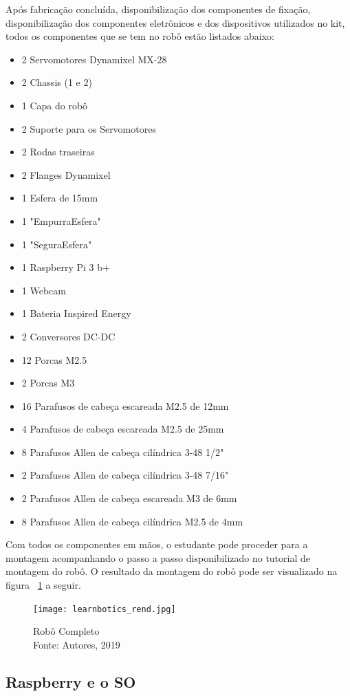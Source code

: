 Após fabricação concluída, disponibilização dos componentes de fixação, disponibilização dos componentes eletrônicos e dos dispositivos utilizados no kit, todos os componentes que se tem no robô estão listados abaixo:
\begin{itemize}
	\item 2 Servomotores Dynamixel MX-28
	\item 2 Chassis (1 e 2)
	\item 1 Capa do robô
	\item 2 Suporte para os Servomotores
	\item 2 Rodas traseiras
	\item 2 Flanges Dynamixel
	\item 1 Esfera de 15mm
	\item 1 "EmpurraEsfera"
	\item 1 "SeguraEsfera"
	\item 1 Raspberry Pi 3 b+
	\item 1 Webcam
	\item 1 Bateria Inspired Energy
	\item 2 Conversores DC-DC
	\item 12 Porcas M2.5
	\item 2 Porcas M3
	\item 16 Parafusos de cabeça escareada M2.5 de 12mm
	\item 4 Parafusos de cabeça escareada M2.5 de 25mm
	\item 8 Parafusos Allen de cabeça cilíndrica 3-48 1/2"
	\item 2 Parafusos Allen de cabeça cilíndrica 3-48 7/16"
	\item 2 Parafusos Allen de cabeça escareada M3 de 6mm
	\item 8 Parafusos Allen de cabeça cilíndrica M2.5 de 4mm
\end{itemize}
Com todos os componentes em mãos, o estudante pode proceder para a montagem acompanhando o passo a passo disponibilizado no tutorial de montagem do robô. O resultado da montagem do robô pode ser visualizado na figura ~\ref{fig:learnbotics_rend} a seguir.
\begin{figure}[h!]
	\centering
	\texttt{[image: learnbotics\_rend.jpg]}\\
	\caption{Robô Completo \\ Fonte: Autores, 2019}
	\label{fig:learnbotics_rend}
\end{figure}

\subsection{Raspberry e o SO}

